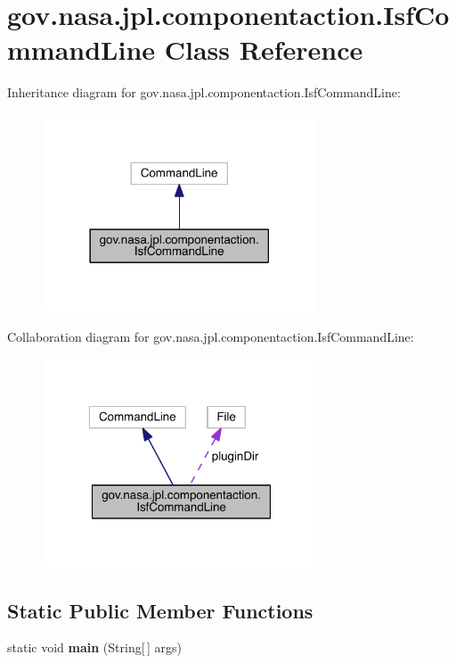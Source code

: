 \section{gov.\+nasa.\+jpl.\+componentaction.\+Isf\+Command\+Line Class Reference}
\label{classgov_1_1nasa_1_1jpl_1_1componentaction_1_1_isf_command_line}


Inheritance diagram for gov.\+nasa.\+jpl.\+componentaction.\+Isf\+Command\+Line\+:
\nopagebreak
\begin{figure}[H]
\begin{center}
\leavevmode
\includegraphics[width=230pt]{classgov_1_1nasa_1_1jpl_1_1componentaction_1_1_isf_command_line__inherit__graph}
\end{center}
\end{figure}


Collaboration diagram for gov.\+nasa.\+jpl.\+componentaction.\+Isf\+Command\+Line\+:
\nopagebreak
\begin{figure}[H]
\begin{center}
\leavevmode
\includegraphics[width=232pt]{classgov_1_1nasa_1_1jpl_1_1componentaction_1_1_isf_command_line__coll__graph}
\end{center}
\end{figure}
\subsection*{Static Public Member Functions}
\begin{DoxyCompactItemize}
\item 
static void {\bf main} (String[$\,$] args)
\end{DoxyCompactItemize}
